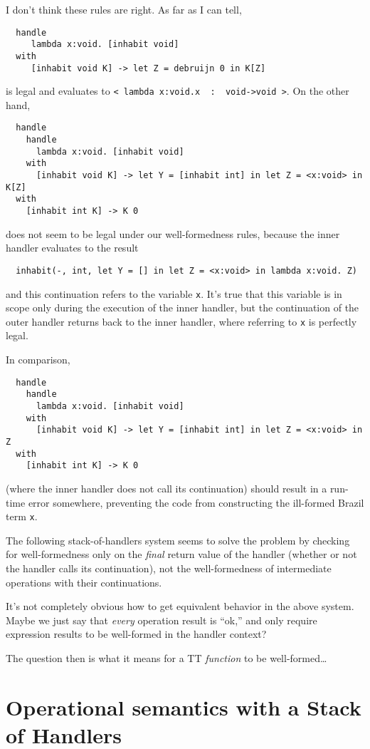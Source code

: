 \documentclass{article}
\begin{document}
I don't think these rules are right. As far as I can tell,
\begin{verbatim}
  handle
     lambda x:void. [inhabit void]
  with
     [inhabit void K] -> let Z = debruijn 0 in K[Z]
\end{verbatim}
is legal and evaluates to \verb|< lambda x:void.x  :  void->void >|. On the other hand,
\begin{verbatim}
  handle
    handle
      lambda x:void. [inhabit void]
    with
      [inhabit void K] -> let Y = [inhabit int] in let Z = <x:void> in K[Z]
  with
    [inhabit int K] -> K 0
\end{verbatim}
does not seem to be legal under our well-formedness rules, because the inner handler evaluates to the result
\begin{verbatim}
  inhabit(-, int, let Y = [] in let Z = <x:void> in lambda x:void. Z)
\end{verbatim}
and this continuation refers to the variable \verb|x|. It's true that this variable
is in scope only during the execution of the inner handler, but the continuation of the
outer handler returns back to the inner handler, where referring to \verb|x| is
perfectly legal.

In comparison,
\begin{verbatim}
  handle
    handle
      lambda x:void. [inhabit void]
    with
      [inhabit void K] -> let Y = [inhabit int] in let Z = <x:void> in Z
  with
    [inhabit int K] -> K 0
\end{verbatim}
(where the inner handler does not call its continuation) should result in a run-time error somewhere,
preventing the code from constructing the ill-formed Brazil term \verb|x|.

The following stack-of-handlers system seems to solve the problem by checking for well-formedness only
on the \emph{final} return value of the handler (whether or not the handler calls its
continuation), not the well-formedness of intermediate operations with their continuations.

It's not completely obvious how to get equivalent behavior in the above system.
Maybe we just say that \emph{every} operation result is ``ok,'' and only require
expression results to be well-formed in the handler context?

The question then is what it means for a TT \emph{function} to be well-formed\ldots

\section{Operational semantics with a Stack of Handlers}
\label{sec:oper-semant-stack}
\end{document}
